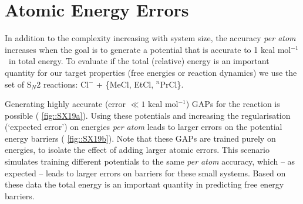 \documentclass[11pt]{article}
\numberwithin{equation}{subsection}
\newcommand{\kcal}{kcal mol$^{-1}$}
\begin{document}
\clearpage
\section{Atomic Energy Errors}  \label{section::SI_atomic_energy_errors}

In addition to the complexity increasing with system size, the accuracy \emph{per atom} increases when the goal is to generate a potential that is accurate to 1 \kcal~in total energy. To evaluate if the total (relative) energy is an important quantity for our target properties (free energies or reaction dynamics) we use the set of S${}_N$2 reactions: Cl$^{-}$ + \{MeCl, EtCl, ${}^n$PrCl\}. 

Generating highly accurate (error $\ll 1$ \kcal) GAPs for the reaction is possible (\figurename{ \ref{fig::SX19a}}). Using these potentials and increasing the regularisation (`expected error') on energies \emph{per atom} leads to larger errors on the potential energy  barriers (\figurename{ \ref{fig::SX19b}}). Note that these GAPs are trained purely on energies, to isolate the effect of adding larger atomic errors. This scenario simulates training different potentials to the same \emph{per atom} accuracy, which -- as expected -- leads to larger errors on barriers for these small systems. Based on these data the total energy is an important quantity in predicting {\large {\color{red} free}} energy barriers.
\end{document}
